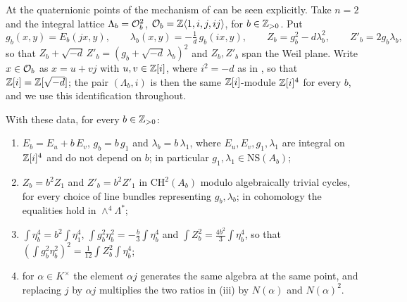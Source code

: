 At the quaternionic points of  the mechanism of
 can be seen explicitly. Take $n=2$ and the integral
lattice
$\Lambda_{b}=\mathcal{O}_{b}^{2}$, $\mathcal{O}_{b}=\mathbb{Z}\langle 1,i,j,ij\rangle$, for
$b\in\mathbb{Z}_{>0}$. Put
\[
  g_{b}(x,y)=E_{b}(jx,y),\qquad
  \lambda_{b}(x,y)=-\tfrac{1}{d}\,g_{b}(ix,y),\qquad
  Z_{b}=g_{b}^{2}-d\lambda_{b}^{2},\qquad Z'_{b}=2g_{b}\lambda_{b},
\]
so that $Z_{b}+\sqrt{-d}\,Z'_{b}=(g_{b}+\sqrt{-d}\,\lambda_{b})^{2}$ and
$Z_{b},Z'_{b}$ span the Weil plane. Write $x\in\mathcal{O}_{b}$ as $x=u+vj$ with
$u,v\in\mathbb{Z}[i]$, where $i^{2}=-d$ as in , so that
$\mathbb{Z}[i]=\mathbb{Z}[\sqrt{-d}]$; the pair $(\Lambda_{b},i)$ is then the same $\mathbb{Z}[i]$-module
$\mathbb{Z}[i]^{4}$ for every $b$, and we use this identification throughout.

\begin{proposition}
\label{prop:quatdivisible}
With these data, for every $b\in\mathbb{Z}_{>0}$:
\begin{enumerate}[label=\textup{(\roman*)},nosep]
\item $E_{b}=E_{u}+b\,E_{v}$, $g_{b}=b\,g_{1}$ and $\lambda_{b}=b\,\lambda_{1}$,
  where $E_{u},E_{v},g_{1},\lambda_{1}$ are integral on $\mathbb{Z}[i]^{4}$ and do not
  depend on $b$; in particular $g_{1},\lambda_{1}\in\mathrm{NS}(A_{b})$;
\item $Z_{b}=b^{2}Z_{1}$ and $Z'_{b}=b^{2}Z'_{1}$ in $\mathrm{CH}^{2}(A_{b})$
  modulo algebraically trivial cycles, for every choice of line bundles
  representing $g_{b},\lambda_{b}$; in cohomology the equalities hold in
  $\wedge^{4}\Lambda^{*}$;
\item $\int\eta_{b}^{4}=b^{2}\int\eta_{1}^{4}$,
  $\int g_{b}^{2}\eta_{b}^{2}=-\tfrac{b}{3}\int\eta_{b}^{4}$ and
  $\int Z_{b}^{2}=\tfrac{4b^{2}}{3}\int\eta_{b}^{4}$, so that
  $(\int g_{b}^{2}\eta_{b}^{2})^{2}=\tfrac{1}{12}\int Z_{b}^{2}\int\eta_{b}^{4}$;
\item for $\alpha\in K^{\times}$ the element $\alpha j$ generates the same
  algebra at the same point, and replacing $j$ by $\alpha j$ multiplies the
  two ratios in \textup{(iii)} by $N(\alpha)$ and $N(\alpha)^{2}$.
\end{enumerate}
\end{proposition}

